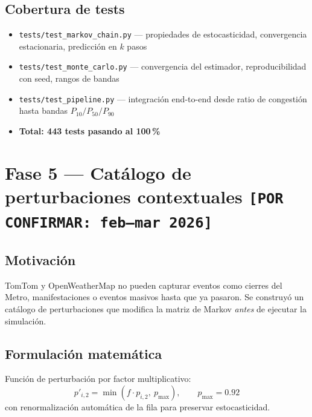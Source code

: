 \documentclass[11pt,a4paper]{article}
\begin{document}
\subsection{Cobertura de tests}
\begin{itemize}
  \item \texttt{tests/test\_markov\_chain.py} --- propiedades de estocasticidad, convergencia estacionaria, predicción en $k$ pasos
  \item \texttt{tests/test\_monte\_carlo.py} --- convergencia del estimador, reproducibilidad con seed, rangos de bandas
  \item \texttt{tests/test\_pipeline.py} --- integración end-to-end desde ratio de congestión hasta bandas $P_{10}/P_{50}/P_{90}$
  \item \textbf{Total: 443 tests pasando al 100\,\%}
\end{itemize}

\section{Fase 5 --- Catálogo de perturbaciones contextuales \texttt{[POR CONFIRMAR: feb--mar 2026]}}

\subsection{Motivación}
TomTom y OpenWeatherMap no pueden capturar eventos como cierres del Metro, manifestaciones o eventos masivos hasta que ya pasaron. Se construyó un catálogo de perturbaciones que modifica la matriz de Markov \textit{antes} de ejecutar la simulación.

\subsection{Formulación matemática}
Función de perturbación por factor multiplicativo:
\[
p'_{i,2} = \min(f \cdot p_{i,2},\ p_{\max}), \qquad p_{\max} = 0.92
\]
con renormalización automática de la fila para preservar estocasticidad.
\end{document}
